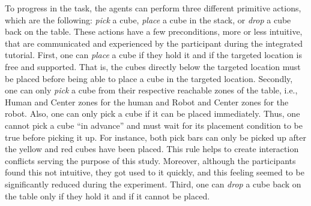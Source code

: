 To progress in the task, the agents can perform three different primitive actions, which are the following: \textit{pick} a cube, \textit{place} a cube in the stack, or \textit{drop} a cube back on the table.
These actions have a few preconditions, more or less intuitive, that are communicated and experienced by the participant during the integrated tutorial.
First, one can \textit{place} a cube if they hold it and if the targeted location is free and supported. That is, the cubes directly below the targeted location must be placed before being able to place a cube in the targeted location.
Secondly, one can only \textit{pick} a cube from their respective reachable zones of the table, i.e., Human and Center zones for the human and Robot and Center zones for the robot. Also, one can only pick a cube if it can be placed immediately. Thus, one cannot pick a cube ``in advance'' and must wait for its placement condition to be true before picking it up. For instance, both pick bars can only be picked up after the yellow and red cubes have been placed. This rule helps to create interaction conflicts serving the purpose of this study. Moreover, although the participants found this not intuitive, they got used to it quickly, and this feeling seemed to be significantly reduced during the experiment.
Third, one can \textit{drop} a cube back on the table only if they hold it and if it cannot be placed.


